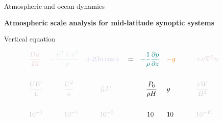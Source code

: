 \documentclass[aspectratio=169,xcolor=dvipsnames]{beamer}
\newcommand{\graylevel}{90} %
\newcommand{\textcolorg}[2]{%
  \textcolor{verylightgray!\graylevel!#1}{#2}%
}
\begin{document}
\begin{frame}[t]{Atmospheric and ocean dynamics}

\vspace{-1.0em}

\begin{center}
\textbf{{\large
Atmospheric scale analysis for mid-latitude synoptic systems
}}
\end{center}

\small 
\center 

\vspace{-0.5em}

Vertical equation

\begin{align*}
    &\textcolorg{red}{    \frac{Dw}{Dt}   } &
    &\textcolorg{cyan}{   - \frac{u^2 + v^2}{a}   }&
    &\textcolorg{blue}{   + 2\Omega u \cos\phi    }&
    & = &
    &\textcolor{teal}{   -\frac{1}{\rho}\frac{\partial p}{\partial z} }&
    &\textcolor{orange}{- g \quad}&
    &\textcolorg{purple}{\quad + \nu \nabla^2 w }&
    \\ \\
      &\textcolorg{black}{   \frac{UW}{L}   } &
      &\textcolorg{black}{   \quad\quad\frac{U^2}{a} }&
      &\textcolorg{black}{\quad\quad f_0 U }&
      &&
      &\textcolor{black}{\,\,\,\,\,\frac{P_0} {\rho H}  }&
      &\textcolor{black}{  g    }&
      &\textcolorg{black}{\quad\frac{\nu W}{H^2} }&
    \\ \\
      &\textcolorg{black}{   10^{-7} }&
      &\textcolorg{black}{\quad\quad10^{-5} }&
      &\textcolorg{black}{\quad\quad10^{-3} }&
      &&
      &\textcolor{black}{\quad 10  }&
      &\textcolor{black}{10     }&
      &\textcolorg{black}{\quad10^{-15}}&
\end{align*}

\end{frame}

\end{document}
